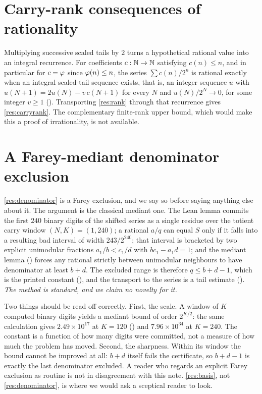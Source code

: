 \documentclass[11pt]{article}
\newcommand{\Stot}{S}
\begin{document}
\section{Carry-rank consequences of rationality}\label{sec:carry-rank}

Multiplying successive scaled tails by $2$ turns a hypothetical rational
value into an integral recurrence.  For coefficients $c:\mathbb{N}\to\mathbb{N}$ satisfying
$c(n)\le n$, and in particular for $c=\varphi$ since $\varphi(n)\le n$, the series
$\sum c(n)/2^n$ is
rational exactly when an integral scaled-tail sequence exists, that is, an
integer sequence $u$ with
$u(N+1)=2u(N)-v\,c(N+1)$ for every $N$ and $u(N)/2^N\to0$, for some integer
$v\ge1$
().
Transporting \ref{res:rank} through that recurrence gives \ref{res:carryrank}.
The complementary finite-rank upper bound, which would make this a proof of
irrationality, is not available.

\section{A Farey-mediant denominator exclusion}\label{sec:denominator}

\ref{res:denominator} is a Farey exclusion, and we say so before saying
anything else about it.  The argument is the classical mediant one.  The Lean
lemma commits the first $240$ binary digits of the shifted series as a single
residue over the totient carry window $(N,K)=(1,240)$; a rational $a/q$ can
equal $\Stot$ only if it falls into a resulting bad interval of width
$243/2^{240}$; that interval is bracketed by two explicit unimodular fractions
$a_1/b<c_1/d$ with $bc_1-a_1d=1$; and the mediant lemma
() forces any
rational strictly between unimodular neighbours to have denominator at least
$b+d$.  The excluded range is therefore $q\le b+d-1$, which is the printed
constant
(),
and the transport to the series is a tail estimate
().
\emph{The method is standard, and we claim no novelty for it.}

Two things should be read off correctly.  First, the scale.  A window of $K$
computed binary digits yields a mediant bound of order $2^{K/2}$: the same
calculation gives $2.49\times10^{17}$ at $K=120$
()
and $7.96\times10^{34}$ at $K=240$.  The constant is a function of how many
digits were committed, not a measure of how much the problem has moved.
Second, the sharpness.  Within its window the bound cannot be improved at all:
$b+d$ itself fails the certificate, so $b+d-1$ is exactly the last denominator
excluded.  A reader who regards an explicit Farey exclusion as routine is not
in disagreement with this note.  \ref{res:basis}, not \ref{res:denominator},
is where we would ask a sceptical reader to look.
\end{document}
